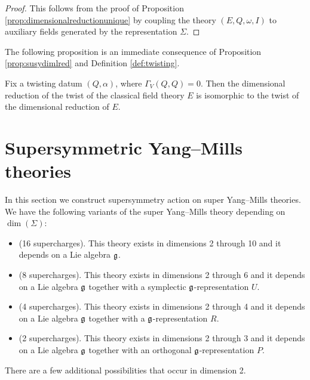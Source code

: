 \documentclass[10pt, oneside]{article}
\begin{document}
\begin{proof}
This follows from the proof of Proposition \ref{prop:dimensionalreductionunique} by coupling the theory $(E, Q, \omega, I)$ to auxiliary fields generated by the representation $\Sigma$.
\end{proof}

The following proposition is an immediate consequence of Proposition \ref{prop:susydimlred} and Definition \ref{def:twisting}.

\begin{prop}
Fix a twisting datum $(Q, \alpha)$, where $\Gamma_V(Q, Q) = 0$. Then the dimensional reduction of the twist of the classical field theory $E$ is isomorphic to the twist of the dimensional reduction of $E$.
\label{prop:twistdimensionalreduction}
\end{prop}

\section{Supersymmetric Yang--Mills theories} \label{sect:SYM}

In this section we construct supersymmetry action on super Yang--Mills theories. We have the following variants of the super Yang--Mills theory depending on $\dim(\Sigma)$:
\begin{itemize}
\item (16 supercharges). This theory exists in dimensions 2 through 10 and it depends on a Lie algebra $\mathfrak g$.

\item (8 supercharges). This theory exists in dimensions 2 through 6 and it depends on a Lie algebra $\mathfrak g$ together with a symplectic $\mathfrak g$-representation $U$.

\item (4 supercharges). This theory exists in dimensions 2 through 4 and it depends on a Lie algebra $\mathfrak g$ together with a $\mathfrak g$-representation $R$.

\item (2 supercharges). This theory exists in dimensions 2 through 3 and it depends on a Lie algebra $\mathfrak g$ together with an orthogonal $\mathfrak g$-representation $P$.
\end{itemize}

There are a few additional possibilities that occur in dimension 2.
\end{document}
